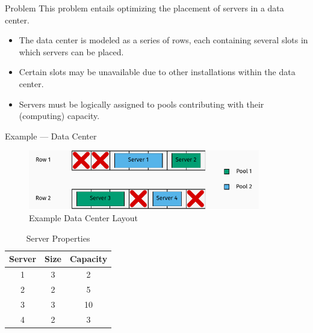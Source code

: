 \begin{frame}{Problem}
  This problem entails optimizing the placement of servers in a data center.

  \begin{itemize}
    \item The data center is modeled as a series of rows, each containing several
          slots in which servers can be placed.
    \item Certain slots may be unavailable due to other installations within the data
          center.
    \item Servers must be logically assigned to pools contributing with their (computing) capacity.
  \end{itemize}
\end{frame}

\begin{frame}{Example --- Data Center}
  \begin{figure}[h]
    \centering
    \includegraphics[width=0.9\textwidth,keepaspectratio]{../assets/dc/dc-slides.pdf}
    \caption{Example Data Center Layout}
  \end{figure}

  \begin{table}[ht]
    \centering
    \begin{tabular}{ccc}
      \toprule
      Server & Size & Capacity \\ \midrule
      1      & 3    & 2        \\
      2      & 2    & 5        \\
      3      & 3    & 10       \\
      4      & 2    & 3        \\ \bottomrule
    \end{tabular}
    \caption{Server Properties}
  \end{table}
\end{frame}

